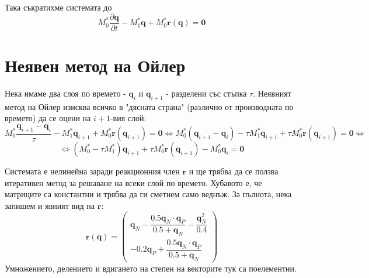 \documentclass[fleqn,12pt]{article}
\begin{document}
Така съкратихме системата до 
\[ M_0^* \frac{\partial \pmb{q}}{\partial t} - M_1^* \pmb{q} + M_0^* \pmb{r}(\pmb{q}) = \pmb{0}  \]

\section{Неявен метод на Ойлер}
Нека имаме два слоя по времето - $\pmb{q}_{i}$ и $\pmb{q}_{i+1}$ - разделени със стъпка $\tau$.
Неявният метод на Ойлер изисква всичко в "дясната страна" (различно от производната по времето)
да се оцени на $i+1$-вия слой:
\[ M_0^* \frac{\pmb{q}_{i+1} - \pmb{q}_i}{\tau} - M_1^* \pmb{q}_{i+1} + M_0^* \pmb{r}(\pmb{q}_{i+1}) = \pmb{0}  
\Leftrightarrow M_0^* (\pmb{q}_{i+1} - \pmb{q}_i) - \tau M_1^* \pmb{q}_{i+1} + \tau M_0^* \pmb{r}(\pmb{q}_{i+1}) = \pmb{0} 
\Leftrightarrow\]
\[ \Leftrightarrow (M_0^* - \tau M_1^*) \pmb{q}_{i+1} + \tau M_0^* \pmb{r}(\pmb{q}_{i+1}) - M_0^* \pmb{q}_i = \pmb{0} \]

Системата е нелинейна заради реакционния член $\pmb{r}$ и ще трябва да се ползва итеративен метод за решаване на всеки слой по времето.
Хубавото е, че матриците са константни и трябва да ги сметнем само веднъж. За пълнота, нека запишем и явният вид на $\pmb{r}$:
\[ \pmb{r}(\pmb{q}) = \begin{pmatrix} 
    \pmb{q}_N - \dfrac{0.5 \pmb{q}_N \cdot \pmb{q}_P}{0.5 + \pmb{q}_N} - \dfrac{\pmb{q}_N^2}{0.4} \\[5mm]
    -0.2 \pmb{q}_P + \dfrac{0.5 \pmb{q}_N \cdot \pmb{q}_P}{0.5 + \pmb{q}_N} 
\end{pmatrix} \]
Умножението, делението и вдигането на степен на векторите тук са поелементни.
\end{document}
